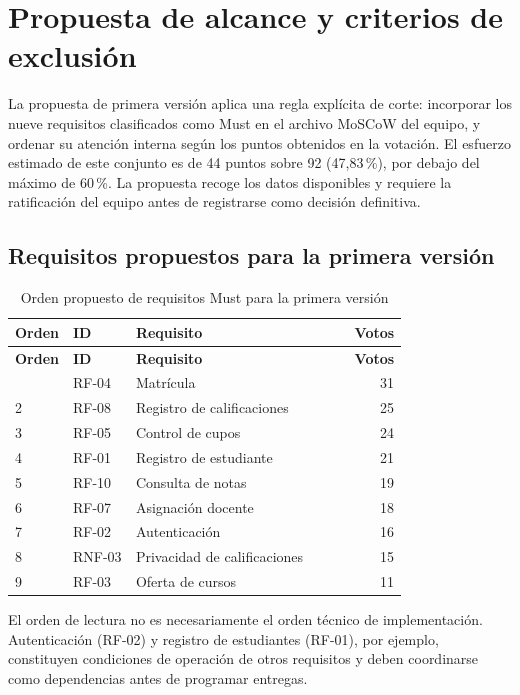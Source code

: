\section{Propuesta de alcance y criterios de exclusión}
\label{sec:decision}

La propuesta de primera versión aplica una regla explícita de corte: incorporar los nueve requisitos clasificados como Must en el archivo MoSCoW del equipo, y ordenar su atención interna según los puntos obtenidos en la votación. El esfuerzo estimado de este conjunto es de 44 puntos sobre 92 (47,83\,\%), por debajo del máximo de 60\,\%. La propuesta recoge los datos disponibles y requiere la ratificación del equipo antes de registrarse como decisión definitiva.

\subsection{Requisitos propuestos para la primera versión}

\begingroup\small
\begin{longtable}{@{}p{0.10\linewidth}p{0.16\linewidth}p{0.52\linewidth}r@{}}
\caption{Orden propuesto de requisitos Must para la primera versión}\label{tab:propuesta-primera-version}\\
\toprule
\textbf{Orden} & \textbf{ID} & \textbf{Requisito} & \textbf{Votos}\\
\midrule\endfirsthead
\toprule\textbf{Orden}&\textbf{ID}&\textbf{Requisito}&\textbf{Votos}\\\midrule\endhead
\bottomrule\endlastfoot
1 & RF-04 & Matrícula & 31\\
2 & RF-08 & Registro de calificaciones & 25\\
3 & RF-05 & Control de cupos & 24\\
4 & RF-01 & Registro de estudiante & 21\\
5 & RF-10 & Consulta de notas & 19\\
6 & RF-07 & Asignación docente & 18\\
7 & RF-02 & Autenticación & 16\\
8 & RNF-03 & Privacidad de calificaciones & 15\\
9 & RF-03 & Oferta de cursos & 11\\
\end{longtable}
\endgroup

El orden de lectura no es necesariamente el orden técnico de implementación. Autenticación (RF-02) y registro de estudiantes (RF-01), por ejemplo, constituyen condiciones de operación de otros requisitos y deben coordinarse como dependencias antes de programar entregas.

